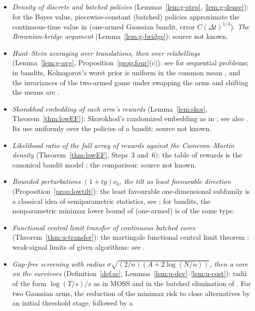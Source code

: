 \documentclass[11pt]{article}
\newcommand{\1}{\mathbf{1}}
\begin{document}
\begin{itemize}
calls an open question.
\item \emph{Density of discrete and batched policies} (Lemmas~\ref{lem:g-step}, \ref{lem:g-dense}): for the Bayes value, piecewise-constant
(batched) policies approximate the continuous-time value in \citet[Section~3.3, Theorem~3]{Adu25} (one-armed Gaussian bandit, error $C(\Delta t)^{1/4}$).
\emph{The Brownian-bridge argument} (Lemma~\ref{lem:g-bridge}): source not known.
\item \emph{Hunt--Stein averaging over translations, then over relabellings} (Lemma~\ref{lem:g-avg}, Proposition~\ref{prop:four}(c)): see \citet{Kie57}
for sequential problems; in bandits, Kolnogorov's worst prior is uniform in the common mean \citep[(10)]{Kol17}, and the invariances of the two-armed
game under swapping the arms and shifting the means are \citet[Lemma~1]{Kol11}.
\item \emph{Skorokhod embedding of each arm's rewards} (Lemma~\ref{lem:skor}, Theorem~\ref{thm:lowEF}): Skorokhod's randomized embedding as in
\citet[Section~37]{Bil95}; see also \citet{Obl04,Hal69}. Its use uniformly over the policies of a bandit: source not known.
\item \emph{Likelihood ratio of the full array of rewards against the Cameron--Martin density} (Theorem~\ref{thm:lowEF}, Steps~3 and~6): the table
of rewards is the canonical bandit model \citep[Section~4.6]{LS}; the comparison: source not known.
\item \emph{Bounded perturbations $(1+tg)\nu_0$, the tilt as least favourable direction} (Proposition~\ref{prop:lowtilt}): the least favourable
one-dimensional subfamily is a classical idea of semiparametric statistics, see \citet{Ste56}; for bandits, the nonparametric minimax lower bound of
\citet[Section~6, (6.2)]{Adu25} (one-armed) is of the same type.
\item \emph{Functional central limit transfer of continuous batched cores} (Theorem~\ref{thm:u-transfer}): the martingale functional central limit theorem
\citep[Chapter~7, Theorem~1.4(b)]{EK86}; weak-signal limits of given algorithms: see \citet{FG21,KW24,KZ21}.
\item \emph{Gap-free screening with radius $\sigma\sqrt{(2/n)(A+2\log(N/n))}$, then a core on the survivors} (Definition~\ref{def:sc},
Lemmas~\ref{lem:u-dev}--\ref{lem:u-cost}): radii of the form $\log(T/s)/s$ as in MOSS \citep[Section~3]{AB09} and in the batched elimination
of \citet{PRCS16}. For two Gaussian arms, the reduction of the minimax risk to close alternatives by an initial threshold stage, followed by a

\end{itemize}
\end{document}
